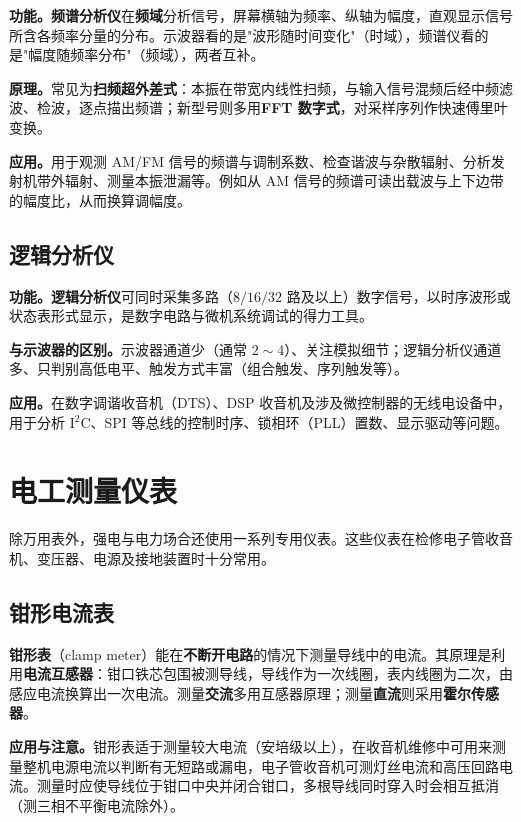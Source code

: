 \documentclass[12pt,UTF8]{ctexbook}
\begin{document}
\textbf{功能。}\textbf{频谱分析仪}在\textbf{频域}分析信号，屏幕横轴为频率、纵轴为幅度，直观显示信号所含各频率分量的分布。示波器看的是"波形随时间变化"（时域），频谱仪看的是"幅度随频率分布"（频域），两者互补。

\textbf{原理。}常见为\textbf{扫频超外差式}：本振在带宽内线性扫频，与输入信号混频后经中频滤波、检波，逐点描出频谱；新型号则多用\textbf{FFT 数字式}，对采样序列作快速傅里叶变换。

\textbf{应用。}用于观测 AM/FM 信号的频谱与调制系数、检查谐波与杂散辐射、分析发射机带外辐射、测量本振泄漏等。例如从 AM 信号的频谱可读出载波与上下边带的幅度比，从而换算调幅度。

\subsection{逻辑分析仪}

\textbf{功能。}\textbf{逻辑分析仪}可同时采集多路（$8/16/32$ 路及以上）数字信号，以时序波形或状态表形式显示，是数字电路与微机系统调试的得力工具。

\textbf{与示波器的区别。}示波器通道少（通常 $2\sim 4$）、关注模拟细节；逻辑分析仪通道多、只判别高低电平、触发方式丰富（组合触发、序列触发等）。

\textbf{应用。}在数字调谐收音机（DTS）、DSP 收音机及涉及微控制器的无线电设备中，用于分析 I$^2$C、SPI 等总线的控制时序、锁相环（PLL）置数、显示驱动等问题。

\section{电工测量仪表}
\label{sec:electrical_meters}

除万用表外，强电与电力场合还使用一系列专用仪表。这些仪表在检修电子管收音机、变压器、电源及接地装置时十分常用。

\subsection{钳形电流表}

\textbf{钳形表}（clamp meter）能在\textbf{不断开电路}的情况下测量导线中的电流。其原理是利用\textbf{电流互感器}：钳口铁芯包围被测导线，导线作为一次线圈，表内线圈为二次，由感应电流换算出一次电流。测量\textbf{交流}多用互感器原理；测量\textbf{直流}则采用\textbf{霍尔传感器}。

\textbf{应用与注意。}钳形表适于测量较大电流（安培级以上），在收音机维修中可用来测量整机电源电流以判断有无短路或漏电，电子管收音机可测灯丝电流和高压回路电流。测量时应使导线位于钳口中央并闭合钳口，多根导线同时穿入时会相互抵消（测三相不平衡电流除外）。
\end{document}
